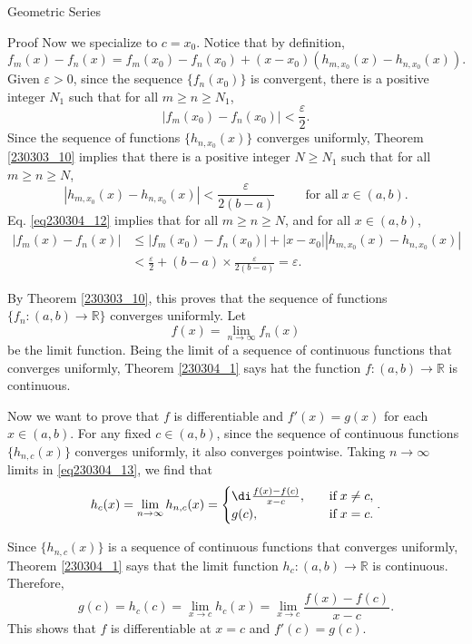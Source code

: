 \begin{example}[label=230305_16]{Geometric Series}
\begin{example}[label=230304_9]{}
\begin{myproof}{Proof}
Now we specialize to $c=x_0$. Notice that by definition, 
\begin{equation}
\label{eq230304_12} f_m(x)-f_n(x)=f_m(x_0)-f_n(x_0)+(x-x_0)\left(h_{m,x_0}(x)-h_{n,x_0}(x)\right).\end{equation}Given $\varepsilon>0$, since the sequence $\{f_n(x_0)\}$ is convergent, there is a positive integer $N_1$ such that for all $m\geq n\geq N_1$, 
\[|f_m(x_0)-f_n(x_0)|<\frac{\varepsilon}{2}.\]\bp
Since the sequence of functions $\{h_{n,x_0}(x)\}$ converges uniformly,   Theorem \ref{230303_10} implies that there is a positive integer $N\geq N_1$ such that for all $m\geq n\geq N$,
\[|h_{m,x_0}(x)-h_{n,x_0}(x)|<\frac{\varepsilon}{2(b-a)}\hspace{1cm}\text{for all}\;x\in (a,b).\]
Eq. \eqref{eq230304_12}   implies that for all $m\geq n\geq N$, and for all $x\in (a,b)$,
\begin{align*}
|f_m(x)-f_n(x)|&\leq |f_m(x_0)-f_n(x_0)|+|x-x_0||h_{m,x_0}(x)-h_{n,x_0}(x)|
\\
&<\frac{\varepsilon}{2}+(b-a)\times \frac{\varepsilon}{2(b-a)}=\varepsilon.
\end{align*}

By Theorem \ref{230303_10}, this proves that the sequence of functions $\{f_n:(a,b)\to\mathbb{R}\}$ converges uniformly.   Let
\[f(x)=\lim_{n\to \infty}f_n(x)\] be the limit function. Being the limit of a sequence of continuous functions that converges uniformly, Theorem \ref{230304_1} says hat the function $f:(a,b)\to\mathbb{R}$ is continuous. 

 Now we want to prove that $f$ is differentiable and $f'(x)=g(x)$ for each $x\in (a,b)$. 
For any fixed $c\in (a,b)$, since the sequence of continuous functions $\{h_{n,c}(x)\}$ converges uniformly, it also converges pointwise. Taking $n\to\infty$ limits  in \eqref{eq230304_13}, we find that
\[h_c(x)=\lim_{n\to \infty}h_{n,c}(x)=\begin{cases}\di\frac{f(x)-f(c)}{x-c}, \quad &\text{if}\;x\neq c,\\g(c),\quad &\text{if}\;x=c.\end{cases}.\]

Since $\{h_{n,c}(x)\}$ is a sequence of continuous functions that converges uniformly,  Theorem \ref{230304_1} says that the limit function $h_c:(a,b)\to\mathbb{R}$ is continuous. Therefore,
\[g(c)=h_c(c)=\lim_{x\to c}h_c(x)=\lim_{x\to c}\frac{f(x)-f(c)}{x-c}.\]
This shows that $f$ is differentiable at $x=c$ and $f'(c)=g(c)$.
\end{myproof}


\end{example}
\end{example}
